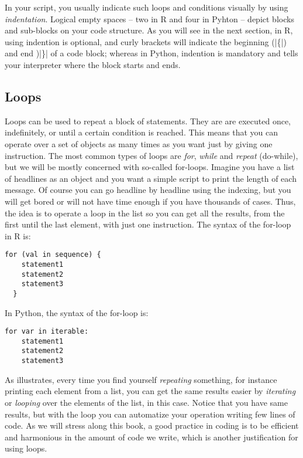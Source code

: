 In your script, you usually indicate such loops and conditions
visually by using \emph{indentation}. Logical empty spaces -- two in R and four in
Pyhton -- depict blocks and sub-blocks on your code structure.
As you will see in the next section, in R, using indention
is optional, and curly brackets will indicate the beginning (|\{|)
and end )|\}| of a code block; whereas in Python, indention
is mandatory and tells your interpreter where the block
starts and ends.





\subsection{Loops}
\label{sec:loops}
Loops can be used to repeat a block of statements.
They are are executed once, indefinitely, or
until a certain condition is reached. This means that you can operate
over a set of objects as many times as you want just by giving one
instruction. The most common types of loops are \emph{for},
\emph{while} and \emph{repeat} (do-while), but we will be mostly
concerned with so-called for-loops. Imagine you have a list of
headlines as an object and you want a simple script
to print the length of each message. Of course you can go headline
by headline using the indexing, but you will get bored or will not
have time enough if you have thousands of cases. Thus, the idea is to
operate a loop in the list so you can get all the results, from the
first until the last element, with just one instruction.  The syntax
of the for-loop in R is:

\begin{verbatim}
for (val in sequence) {
    statement1
    statement2
    statement3
  }
\end{verbatim}

In Python, the syntax of the for-loop is:

\begin{verbatim}
for var in iterable:
    statement1
    statement2
    statement3
\end{verbatim}



As  illustrates, every time you find yourself
\emph{repeating} something, for instance printing each element from a
list, you can get the same results easier by \emph{iterating} or
\emph{looping} over the elements of the list, in this case.  Notice
that you have same results, but with the loop you can automatize your
operation writing few lines of code. As we will stress along this
book, a good practice in coding is to be efficient and harmonious in
the amount of code we write, which is another justification for using
loops.

